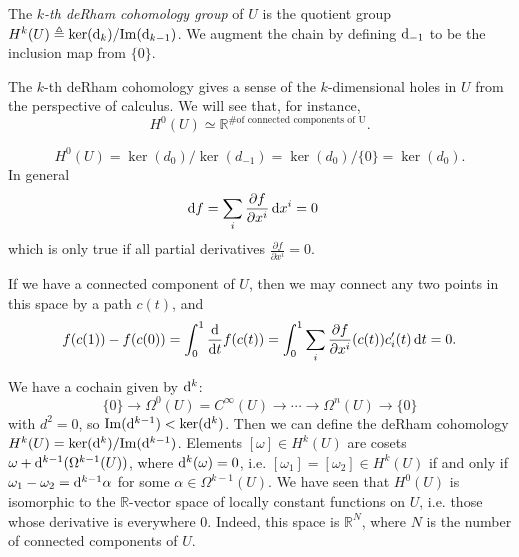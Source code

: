 \begin{defn}
The \emph{$k$-th deRham cohomology group} of $U$ is the quotient group
$H^k(U) \triangleq \ker(\mathop{}\!\mathrm{d}_k) / \mathrm{Im}(\mathop{}\!\mathrm{d}_{k-1})$. We augment
the chain by defining $\mathop{}\!\mathrm{d}_{-1}$ to be the inclusion map from $\{ 0 \}$.
\end{defn}

\begin{remark}
The $k$-th deRham cohomology gives a sense of the $k$-dimensional
holes in $U$ from the perspective of calculus. We will see that, for instance,
$$
H^0(U) \simeq \mathbb{R}^{\text{\# of connected components of U}}.
$$
\end{remark}

\begin{xmpl}
$$
  H^0(U)
= \ker(d_0) / \ker(d_{-1})
= \ker(d_0) / \{ 0 \}
= \ker(d_0).
$$
In general
\begin{align*}
   \mathop{}\!\mathrm{d} f
&= \sum_i
     \frac{\partial f}{\partial x^i}
     \mathop{}\!\mathrm{d} x^i = 0
\end{align*}
which is only true if all partial derivatives
$\frac{\partial f}{\partial x^i} = 0$.

If we have a connected component of $U$, then we may connect any two
points in this space by a path $c(t)$, and
$$
  f(c(1)) - f(c(0))
= \int_0^1 \frac{\mathop{}\!\mathrm{d}}{\mathop{}\!\mathrm{d} t} f(c(t))
= \int_0^1
    \sum_i
      \frac{\partial f}
           {\partial x^i}
      (c(t)) c_i^\prime(t)
      \mathop{}\!\mathrm{d} t
= 0.
$$
\end{xmpl}

We have a cochain given by $\mathop{}\!\mathrm{d}^k$:
$$
    \{ 0 \}
\to \Omega^0(U) = C^\infty(U)
\to \cdots
\to \Omega^n(U)
\to \{ 0 \}
$$
with $d^2 = 0$,
so $\mathrm{Im}(\mathop{}\!\mathrm{d}^{k-1}) < \ker(\mathop{}\!\mathrm{d}^k)$. Then we can define the
deRham cohomology $H^k(U) = \ker(\mathop{}\!\mathrm{d}^k) / \mathrm{Im}(\mathop{}\!\mathrm{d}^{k-1})$.
Elements $[\omega] \in H^k(U)$ are cosets
$\omega + \mathop{}\!\mathrm{d}^{k-1}(\Omega^{k-1}(U))$, where $\mathop{}\!\mathrm{d}^k(\omega) = 0$,
i.e. $[\omega_1] = [\omega_2] \in H^k(U)$ if and only if
$\omega_1 - \omega_2 = \mathop{}\!\mathrm{d}^{k-1} \alpha$ for some
$\alpha \in \Omega^{k-1}(U)$. We have seen that
$H^0(U)$ is isomorphic to the $\mathbb{R}$-vector space of locally
constant functions on $U$, i.e. those whose derivative is everywhere
0. Indeed, this space is $\mathbb{R}^N$, where $N$ is the number of
connected components of $U$.

